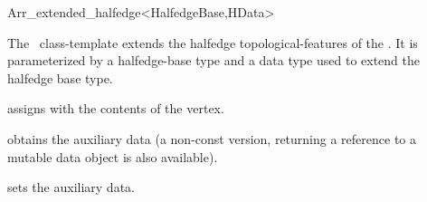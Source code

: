 
\ccRefPageBegin

\begin{ccRefClass}{Arr_extended_halfedge<HalfedgeBase,HData>}

\ccDefinition
  The \ccRefName\ class-template extends the halfedge topological-features of
  the \dcel. It is parameterized by a halfedge-base type 
  and a data type  used to extend the halfedge base type.


\ccIsModel

\ccInheritsFrom

\ccCreation
{}
  {assigns \ccVar{} with the contents of the  vertex.}

\ccAccessFunctions

\def\ccLongParamLayout{\ccTrue}
  {obtains the auxiliary data (a non-const version, returning a reference
   to a mutable data object is also available).}
\def\ccLongParamLayout{\ccFalse}

\ccModifiers
  {sets the auxiliary data.}

\ccSeeAlso

\end{ccRefClass}

\ccRefPageEnd
